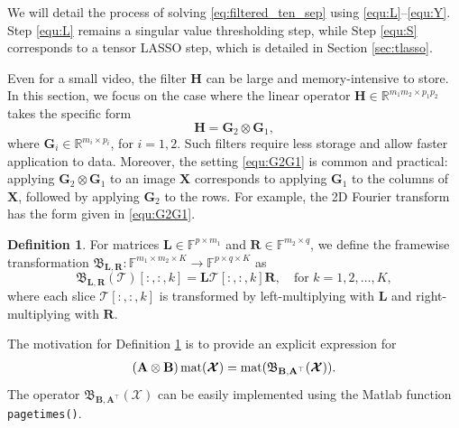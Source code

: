 \documentclass[10pt]{article}  	%
\theoremstyle{definition}
\newtheorem{definition}[theorem]{Definition}
\theoremstyle{definition}
\newcommand{\R}{{\mathbb{R}}}
\newcommand{\Fb}{ \boldsymbol{{\mathbb{F}}}}
\newcommand{\Xc}{ \boldsymbol{{\mathcal{X}}}}
\newcommand{\Tc}{\boldsymbol{{\mathcal{T}}}}
\DeclareMathOperator*{\mat}{{\rm{mat}}}
\DeclareMathOperator*{\ten}{{\rm{ten}}}
\newcommand{\mA}{\mathbf{A}}
\newcommand{\mB}{\mathbf{B}}
\newcommand{\mG}{\mathbf{G}}
\newcommand{\mH}{\mathbf{H}}
\newcommand{\mL}{\mathbf{L}}
\newcommand{\mR}{\mathbf{R}}
\newcommand{\mX}{\mathbf{X}}
\theoremstyle{remark}
\begin{document}
We will detail the process of solving \eqref{eq:filtered_ten_sep} using \eqref{equ:L}--\eqref{equ:Y}. Step \eqref{equ:L} remains a singular value thresholding step, while Step \eqref{equ:S} corresponds to a tensor LASSO step, which is detailed in Section \ref{sec:tlasso}.

Even for a small video, the filter $\mH$ can be large and memory-intensive to store. In this section, we focus on the case where the linear operator $\mH\in\R^{m_1m_2\times p_1p_2}$ takes the specific form
\begin{equation}\label{equ:G2G1}
\mH = \mG_2 \otimes \mG_1,
\end{equation}
where $\mG_i \in \R^{m_i \times p_i}$, for $i = 1,2$. 
Such filters require less storage and allow faster application to data. Moreover, the setting \eqref{equ:G2G1} is common and practical: applying $\mG_2 \otimes \mG_1$ to an image $\mX$ corresponds to applying $\mG_1$ to the columns of $\mX$, followed by applying $\mG_2$ to the rows. For example, the 2D Fourier transform has the form given in \eqref{equ:G2G1}.

%

\begin{definition}\label{bilinear-trans}
\normalfont
For matrices $\mL \in \mathbb{F}^{p \times m_1}$ and $\mR \in \mathbb{F}^{m_2 \times q}$, we define the framewise transformation $\mathfrak{B}_{\mL, \mR}: \Fb^{m_1\times m_2\times K} \rightarrow  \Fb^{p\times q\times K}$ as
\[
\mathfrak{B}_{\mL, \mR}(\boldsymbol{\mathcal{T}})[:,:,k] = \mL\Tc[:,:,k]\mR, \quad \text{for } k = 1, 2, \dots, K,
\]
 where each slice $\boldsymbol{\mathcal{T}}[:,:,k]$ is transformed by left-multiplying with $\mL$ and right-multiplying with $\mR$.
\end{definition}

The motivation for Definition \ref{bilinear-trans} is to provide an explicit expression for %
\begin{align}\label{equ:AB}
(\mA \otimes \mB)\mat(\Xc) = \mat(\mathfrak{B}_{\mB, \mA^\top}(\Xc)).
\end{align}
The operator $\mathfrak{B}_{\mB, \mA^\top}(\Xc)$ can be easily implemented using the Matlab function \verb|pagetimes()|.
\end{document}
